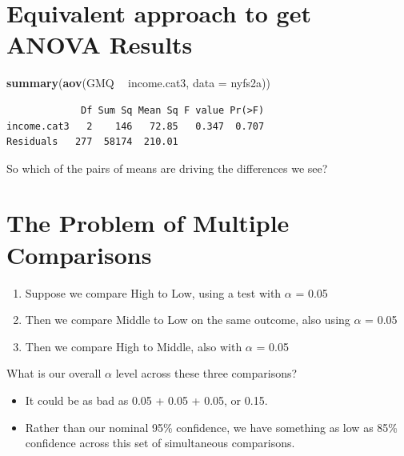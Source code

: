 \documentclass[
]{book}
\newenvironment{Shaded}{\begin{snugshade}}{\end{snugshade}}
\newcommand{\DataTypeTok}[1]{\textcolor[rgb]{0.13,0.29,0.53}{#1}}
\newcommand{\KeywordTok}[1]{\textcolor[rgb]{0.13,0.29,0.53}{\textbf{#1}}}
\newcommand{\NormalTok}[1]{#1}
\newcommand{\OperatorTok}[1]{\textcolor[rgb]{0.81,0.36,0.00}{\textbf{#1}}}
\newcommand{\StringTok}[1]{\textcolor[rgb]{0.31,0.60,0.02}{#1}}
\providecommand{\tightlist}{%
  \setlength{\itemsep}{0pt}\setlength{\parskip}{0pt}}
\begin{document}
\hypertarget{equivalent-approach-to-get-anova-results}{%
\section{Equivalent approach to get ANOVA Results}\label{equivalent-approach-to-get-anova-results}}

\begin{Shaded}
\begin{Highlighting}[]
\KeywordTok{summary}\NormalTok{(}\KeywordTok{aov}\NormalTok{(GMQ }\OperatorTok{~}\StringTok{ }\NormalTok{income.cat3, }\DataTypeTok{data =}\NormalTok{ nyfs2a))}
\end{Highlighting}
\end{Shaded}

\begin{verbatim}
             Df Sum Sq Mean Sq F value Pr(>F)
income.cat3   2    146   72.85   0.347  0.707
Residuals   277  58174  210.01               
\end{verbatim}

So which of the pairs of means are driving the differences we see?

\hypertarget{the-problem-of-multiple-comparisons}{%
\section{The Problem of Multiple Comparisons}\label{the-problem-of-multiple-comparisons}}

\begin{enumerate}
\def\labelenumi{\arabic{enumi}.}
\tightlist
\item
  Suppose we compare High to Low, using a test with \(\alpha\) = 0.05
\item
  Then we compare Middle to Low on the same outcome, also using \(\alpha\) = 0.05
\item
  Then we compare High to Middle, also with \(\alpha\) = 0.05
\end{enumerate}

What is our overall \(\alpha\) level across these three comparisons?

\begin{itemize}
\tightlist
\item
  It could be as bad as 0.05 + 0.05 + 0.05, or 0.15.
\item
  Rather than our nominal 95\% confidence, we have something as low as 85\% confidence across this set of simultaneous comparisons.
\end{itemize}
\end{document}
